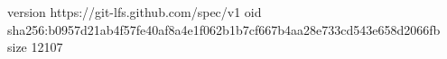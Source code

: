 version https://git-lfs.github.com/spec/v1
oid sha256:b0957d21ab4f57fe40af8a4e1f062b1b7cf667b4aa28e733cd543e658d2066fb
size 12107
